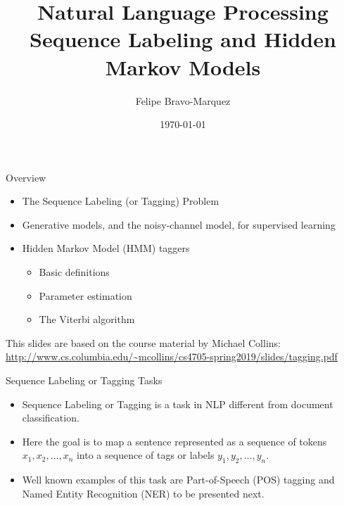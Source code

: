 \documentclass[handout]{beamer}
\title{Natural Language Processing \\ Sequence Labeling and Hidden Markov Models}
\author[Felipe Bravo Márquez]{\footnotesize
 \textcolor[rgb]{0.00,0.00,1.00}{Felipe Bravo-Marquez}}
\date{\today}
\begin{document}
\begin{frame}
\titlepage


\end{frame}



\begin{frame}{Overview}
  \scriptsize
  \begin{itemize}
    \item The Sequence Labeling (or Tagging) Problem
    \item Generative models, and the noisy-channel model, for supervised learning
    \item Hidden Markov Model (HMM) taggers
    \begin{itemize}\scriptsize
    \item Basic definitions
    \item Parameter estimation
    \item The Viterbi algorithm
    \end{itemize}
  \end{itemize}
 This slides are based on the course material by Michael Collins: \url{http://www.cs.columbia.edu/~mcollins/cs4705-spring2019/slides/tagging.pdf}

\end{frame}

\begin{frame}{Sequence Labeling or Tagging Tasks}

  \begin{itemize}
    \item Sequence Labeling or Tagging is a task in NLP different from document classification.
    \item Here the goal is to map a sentence represented as a sequence of tokens $x_1,x_2,\dots,x_n$ into a sequence of tags or labels $y_1,y_2,\dots,y_n$.
    \item Well known examples of this task are Part-of-Speech (POS) tagging and Named Entity Recognition (NER) to be presented next.
    \end{itemize}

\end{frame}
\end{document}

